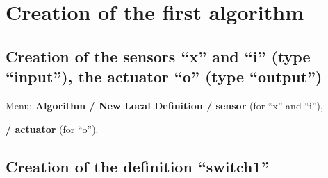 \documentclass[a4paper,twoside]{report}
\begin{document}
\section{Creation of  the first algorithm}
\subsection{Creation of the sensors ``x'' and ``i'' (type ``input''),
the actuator ``o'' (type ``output'')}

Menu: \textbf{Algorithm / New Local Definition / sensor} (for ``x'' and ``i''),

\hspace{157pt}\textbf{ / actuator} (for ``o'').

\subsection{Creation of the definition ``switch1''}
\end{document}
